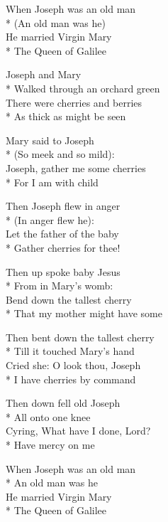

\versemark
When Joseph was an old man\\*
(An old man was he)\\
He married Virgin Mary\\*
The Queen of Galilee\etc

\versemark
Joseph and Mary\\*
Walked through an orchard green\\
There were cherries and berries\\*
As thick as might be seen\etc

\versemark
Mary said to Joseph\\*
(So meek and so mild):\\
Joseph, gather me some cherries\\*
For I am with child\etc

\versemark
Then Joseph flew in anger\\*
(In anger flew he):\\
Let the father of the baby\\*
Gather cherries for thee!\etc

\versemark
Then up spoke baby Jesus\\*
From in Mary’s womb:\\
Bend down the tallest cherry\\*
That my mother might have some\etc

\versemark
Then bent down the tallest cherry\\*
Till it touched Mary’s hand\\
Cried she: O look thou, Joseph\\*
I have cherries by command\etc

\versemark
Then down fell old Joseph\\*
All onto one knee\\
Cyring, What have I done, Lord?\\*
Have mercy on me\etc

\versemark
When Joseph was an old man\\*
An old man was he\\
He married Virgin Mary\\*
The Queen of Galilee\etc

